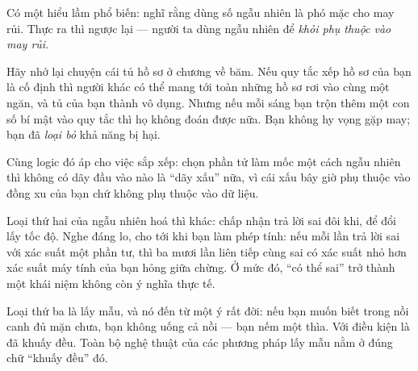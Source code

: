 \documentclass[../../algorithm.tex]{subfiles}
\begin{document}
\begin{dongian}
Có một hiểu lầm phổ biến: nghĩ rằng dùng số ngẫu nhiên là phó mặc cho may rủi. Thực ra thì ngược lại --- người ta dùng ngẫu nhiên để \emph{khỏi phụ thuộc vào may rủi}.

Hãy nhớ lại chuyện cái tủ hồ sơ ở chương về băm. Nếu quy tắc xếp hồ sơ của bạn là cố định thì người khác có thể mang tới toàn những hồ sơ rơi vào cùng một ngăn, và tủ của bạn thành vô dụng. Nhưng nếu mỗi sáng bạn trộn thêm một con số bí mật vào quy tắc thì họ không đoán được nữa. Bạn không hy vọng gặp may; bạn đã \emph{loại bỏ} khả năng bị hại.

Cùng logic đó áp cho việc sắp xếp: chọn phần tử làm mốc một cách ngẫu nhiên thì không có dãy đầu vào nào là ``dãy xấu'' nữa, vì cái xấu bây giờ phụ thuộc vào đồng xu của bạn chứ không phụ thuộc vào dữ liệu.

Loại thứ hai của ngẫu nhiên hoá thì khác: chấp nhận trả lời sai đôi khi, để đổi lấy tốc độ. Nghe đáng lo, cho tới khi bạn làm phép tính: nếu mỗi lần trả lời sai với xác suất một phần tư, thì ba mươi lần liên tiếp cùng sai có xác suất nhỏ hơn xác suất máy tính của bạn hỏng giữa chừng. Ở mức đó, ``có thể sai'' trở thành một khái niệm không còn ý nghĩa thực tế.

Loại thứ ba là lấy mẫu, và nó đến từ một ý rất đời: nếu bạn muốn biết trong nồi canh đủ mặn chưa, bạn không uống cả nồi --- bạn nếm một thìa. Với điều kiện là đã khuấy đều. Toàn bộ nghệ thuật của các phương pháp lấy mẫu nằm ở đúng chữ ``khuấy đều'' đó.
\end{dongian}
\end{document}
